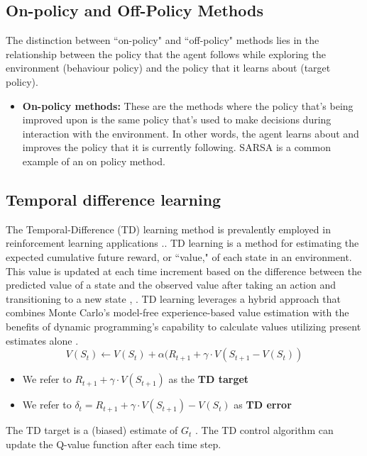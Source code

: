 \subsection{On-policy and Off-Policy Methods}
The distinction between ``on-policy" and ``off-policy" methods lies in the relationship between the policy that the agent follows while exploring the environment (behaviour policy) and the policy that it learns about (target policy). 

\begin{itemize}
    \item \textbf{On-policy methods:} 
    These are the methods where the policy that's being improved upon is the same policy that's used to make decisions during interaction with the environment. In other words, the agent learns about and improves the policy that it is currently following. SARSA is a common example of an on policy method.
\end{itemize}
 

\subsection{Temporal difference learning}

The Temporal-Difference (TD) learning method is prevalently employed in reinforcement learning applications \cite{RL3}.. TD learning is a method for estimating the expected cumulative future reward, or ``value," of each state in an environment. This value is updated at each time increment based on the difference between the predicted value of a state and the observed value after taking an action and transitioning to a new state \cite{RL}, \cite{RL2}.
TD learning leverages a hybrid approach that combines Monte Carlo's model-free experience-based value estimation with the benefits of dynamic programming's capability to calculate values utilizing present estimates alone \cite{sutton1988b}. 
\begin{equation}
    V(S_t) \leftarrow V(S_t) + \alpha(R_{t+1} + \gamma \cdot V(S_{t+1} - V(S_t))
\end{equation}
\begin{itemize}
    \item We refer to $R_{t+1} + \gamma \cdot V(S_{t+1})$ as the \textbf{TD target}
    \item We refer to $\delta_{t} = R_{t+1} + \gamma \cdot V(S_{t+1}) - V(S_{t})$ as  \textbf{TD error}
\end{itemize}
The TD target is a (biased) estimate of $G_t$ \cite{RL}. The TD control algorithm can update the Q-value function after each time step. 



